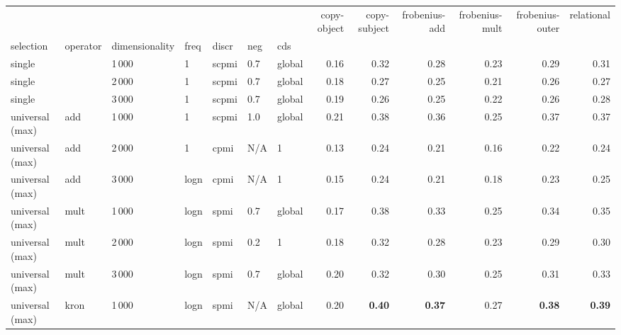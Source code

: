 \begin{tabular}{lllllllrrrrrr}
\toprule
       & {} &      &   &      &     &   &  copy-object &  copy-subject &  frobenius-add &  frobenius-mult &  frobenius-outer &  relational \\
selection & operator & dimensionality & freq & discr & neg & cds &              &               &                &                 &                  &             \\
\midrule
single                 & {}   & 1\,000 & 1    & scpmi & 0.7 & global &         0.16 &          0.32 &           0.28 &            0.23 &             0.29 &        0.31 \\
single                 & {}   & 2\,000 & 1    & scpmi & 0.7 & global &         0.18 &          0.27 &           0.25 &            0.21 &             0.26 &        0.27 \\
single                 & {}   & 3\,000 & 1    & scpmi & 0.7 & global &         0.19 &          0.26 &           0.25 &            0.22 &             0.26 &        0.28 \\ \addlinespace
universal (max)        & add  & 1\,000 & 1    & scpmi & 1.0 & global &         0.21 &          0.38 &           0.36 &            0.25 &             0.37 &        0.37 \\
universal (max)        & add  & 2\,000 & 1    & cpmi  & N/A & 1      &         0.13 &          0.24 &           0.21 &            0.16 &             0.22 &        0.24 \\
universal (max)        & add  & 3\,000 & logn & cpmi  & N/A & 1      &         0.15 &          0.24 &           0.21 &            0.18 &             0.23 &        0.25 \\ \addlinespace
universal (max)        & mult & 1\,000 & logn & spmi  & 0.7 & global &         0.17 &          0.38 &           0.33 &            0.25 &             0.34 &        0.35 \\
universal (max)        & mult & 2\,000 & logn & spmi  & 0.2 & 1      &         0.18 &          0.32 &           0.28 &            0.23 &             0.29 &        0.30 \\
universal (max)        & mult & 3\,000 & logn & spmi  & 0.7 & global &         0.20 &          0.32 &           0.30 &            0.25 &             0.31 &        0.33 \\ \addlinespace
universal (max)        & kron & 1\,000 & logn & spmi  & N/A & global &         0.20 &          \textbf{0.40} &           \textbf{0.37} &            0.27 &             \textbf{0.38} &        \textbf{0.39} \\

\end{tabular}
